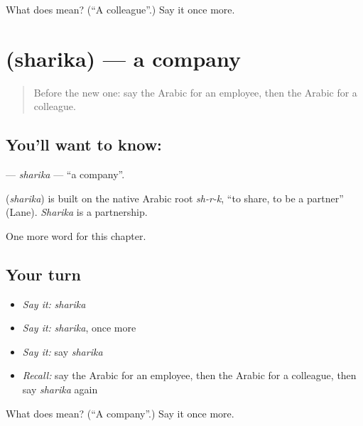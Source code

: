 \begin{tcolorbox}[breakable,colback=teal!4,colframe=teal!35!black,title={Before you move on}]
What does  mean? (\textquotedblleft{}A colleague\textquotedblright{}.) Say it once more.
\end{tcolorbox}
\section[\texorpdfstring{\ar{شركة} (sharika)}{شركة (sharika)}]{ (sharika) — a company}

\label{lesson:AR-C251-sharika}



\begin{quote}
Before the new one: say the Arabic for an employee, then the Arabic for a colleague.
\end{quote}

\subsection*{You'll want to know: }
\textbf{} — \emph{sharika} — \textquotedblleft{}a company\textquotedblright{}.

\begin{cousinweb}
\textbf{} (\emph{sharika}) is built on the native Arabic root \emph{sh-r-k}, \textquotedblleft{}to share, to be a partner\textquotedblright{} (Lane). \emph{Sharika} is a partnership.
\end{cousinweb}

\begin{grammarlens}[title={What you've built}]
One more word for this chapter.
\end{grammarlens}

\subsection*{Your turn}
\begin{itemize}
\raggedright
  \item \emph{Say it:} \emph{sharika}
  \item \emph{Say it:} \emph{sharika}, once more
  \item \emph{Say it:} say \emph{sharika}
  \item \emph{Recall:} say the Arabic for an employee, then the Arabic for a colleague, then say \emph{sharika} again
\end{itemize}

\begin{tcolorbox}[breakable,colback=teal!4,colframe=teal!35!black,title={Before you move on}]
What does  mean? (\textquotedblleft{}A company\textquotedblright{}.) Say it once more.
\end{tcolorbox}
